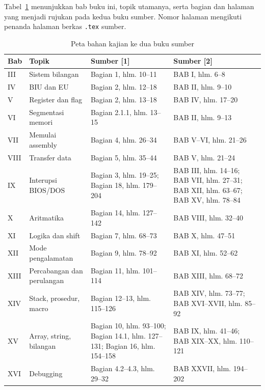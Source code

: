 Tabel~\ref{tab:peta-sumber} menunjukkan bab buku ini, topik utamanya,
serta bagian dan halaman yang menjadi rujukan pada kedua buku sumber.
Nomor halaman mengikuti penanda halaman berkas \texttt{.tex} sumber.

\begin{table}[htbp]
\centering
\caption{Peta bahan kajian ke dua buku sumber}
\label{tab:peta-sumber}
\small
\begin{tabular}{@{}p{1.5cm}p{4.3cm}p{4.2cm}p{4.3cm}@{}}
\toprule
\textbf{Bab} & \textbf{Topik} & \textbf{Sumber [1]} &
\textbf{Sumber [2]} \\
\midrule
III & Sistem bilangan & Bagian 1, hlm. 10--11 &
BAB I, hlm. 6--8 \\
\addlinespace
IV & BIU dan EU & Bagian 2, hlm. 12--18 &
BAB II, hlm. 9--10 \\
\addlinespace
V & Register dan flag & Bagian 2, hlm. 13--18 &
BAB IV, hlm. 17--20 \\
\addlinespace
VI & Segmentasi memori & Bagian 2.1.1, hlm. 13--15 &
BAB II, hlm. 9--13 \\
\addlinespace
VII & Memulai assembly & Bagian 4, hlm. 26--34 &
BAB V--VI, hlm. 21--26 \\
\addlinespace
VIII & Transfer data & Bagian 5, hlm. 35--44 &
BAB V, hlm. 21--24 \\
\addlinespace
IX & Interupsi BIOS/DOS & Bagian 3, hlm. 19--25; Bagian 18,
hlm. 179--204 & BAB III, hlm. 14--16; BAB VII, hlm. 27--31; BAB XII,
hlm. 63--67; BAB XV, hlm. 78--84 \\
\addlinespace
X & Aritmatika & Bagian 14, hlm. 127--142 &
BAB VIII, hlm. 32--40 \\
\addlinespace
XI & Logika dan shift & Bagian 7, hlm. 68--73 &
BAB X, hlm. 47--51 \\
\addlinespace
XII & Mode pengalamatan & Bagian 9, hlm. 78--92 &
BAB XI, hlm. 52--62 \\
\addlinespace
XIII & Percabangan dan perulangan & Bagian 11, hlm. 101--114 &
BAB XIII, hlm. 68--72 \\
\addlinespace
XIV & Stack, prosedur, macro & Bagian 12--13, hlm. 115--126 &
BAB XIV, hlm. 73--77; BAB XVI--XVII, hlm. 85--92 \\
\addlinespace
XV & Array, string, bilangan & Bagian 10, hlm. 93--100; Bagian 14.1,
hlm. 127--131; Bagian 16, hlm. 154--158 & BAB IX, hlm. 41--46;
BAB XIX--XX, hlm. 110--121 \\
\addlinespace
XVI & Debugging & Bagian 4.2--4.3, hlm. 29--32 &
BAB XXVII, hlm. 194--202 \\
\bottomrule
\end{tabular}
\end{table}

